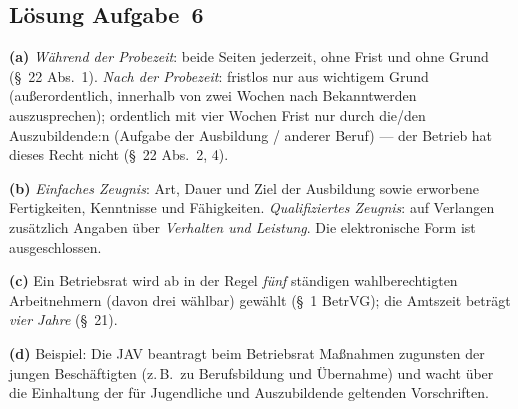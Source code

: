 \documentclass[11pt, a4paper]{article}
\begin{document}
\subsection*{Lösung Aufgabe~6}
\begin{loesung}
\textbf{(a)} \emph{Während der Probezeit}: beide Seiten jederzeit, ohne Frist und ohne Grund
(\S~22 Abs.~1). \emph{Nach der Probezeit}: fristlos nur aus wichtigem Grund (außerordentlich,
innerhalb von zwei Wochen nach Bekanntwerden auszusprechen); ordentlich mit vier Wochen
Frist nur durch die/den Auszubildende:n (Aufgabe der Ausbildung / anderer Beruf) --- der
Betrieb hat dieses Recht nicht (\S~22 Abs.~2, 4).

\textbf{(b)} \emph{Einfaches Zeugnis}: Art, Dauer und Ziel der Ausbildung sowie erworbene
Fertigkeiten, Kenntnisse und Fähigkeiten. \emph{Qualifiziertes Zeugnis}: auf Verlangen
zusätzlich Angaben über \emph{Verhalten und Leistung}. Die elektronische Form ist
ausgeschlossen.

\textbf{(c)} Ein Betriebsrat wird ab in der Regel \emph{fünf} ständigen wahlberechtigten
Arbeitnehmern (davon drei wählbar) gewählt (\S~1 BetrVG); die Amtszeit beträgt
\emph{vier Jahre} (\S~21).

\textbf{(d)} Beispiel: Die JAV beantragt beim Betriebsrat Maßnahmen zugunsten der jungen
Beschäftigten (z.\,B.\ zu Berufsbildung und Übernahme) und wacht über die Einhaltung der für
Jugendliche und Auszubildende geltenden Vorschriften.
\end{loesung}
\end{document}
